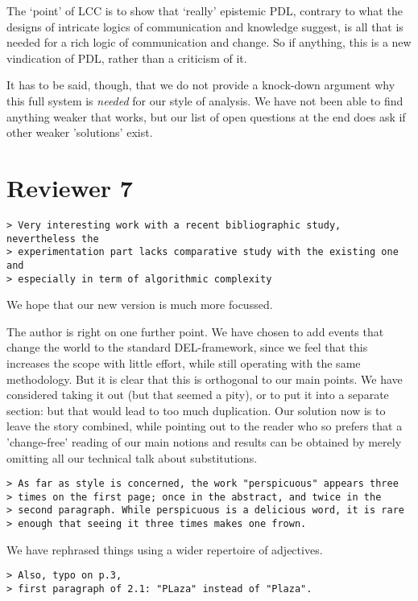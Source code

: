 \documentclass{article}
\begin{document}
The `point' of LCC is to show that `really' epistemic PDL, contrary to
what the designs of intricate logics of communication and knowledge
suggest, is all that is needed for a rich logic of communication and
change. So if anything, this is a new vindication of PDL, rather than
a criticism of it.

It has to be said, though, that we do not provide a knock-down argument
why this full system is {\em needed} for our style of analysis. We have
not been able to find anything weaker that works, but our list of
open questions at the end does ask if other weaker 'solutions' exist.

\section*{Reviewer 7}
\begin{verbatim} 
> Very interesting work with a recent bibliographic study, nevertheless the
> experimentation part lacks comparative study with the existing one and
> especially in term of algorithmic complexity
\end{verbatim}

We hope that our new version is much more focussed.

The author is right on one further point. We have chosen to add
events that change the world to the standard DEL-framework, since
we feel that this increases the scope with little effort, while
still operating with the same methodology. But it is clear that
this is orthogonal to our main points. We have considered taking
it out (but that seemed a pity), or to put it into a separate
section: but that would lead to too much duplication. Our solution
now is to leave the story combined, while pointing out to the reader
who so prefers that a 'change-free' reading of our main notions and
results can be obtained by merely omitting all our technical talk
about substitutions.

\begin{verbatim}
> As far as style is concerned, the work "perspicuous" appears three
> times on the first page; once in the abstract, and twice in the
> second paragraph. While perspicuous is a delicious word, it is rare
> enough that seeing it three times makes one frown.
\end{verbatim} 

We have rephrased things using a wider repertoire of adjectives.

\begin{verbatim}
> Also, typo on p.3,
> first paragraph of 2.1: "PLaza" instead of "Plaza".
\end{verbatim}
\end{document}
